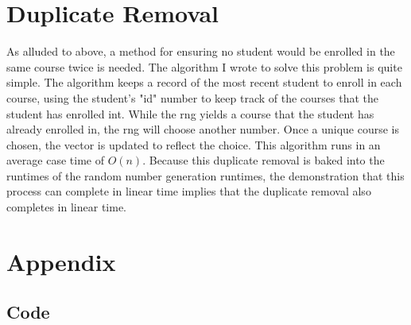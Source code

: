 \documentclass[11pt]{article}
\begin{document}
\section{Duplicate Removal}
As alluded to above, a method for ensuring no student would be enrolled in the same course twice is needed. The algorithm I wrote to solve this problem is quite simple. The algorithm keeps a record of the most recent student to enroll in each course, using the student's "id" number to keep track of the courses that the student has enrolled int. While the rng yields a course that the student has already enrolled in, the rng will choose another number. Once a unique course is chosen, the vector is updated to reflect the choice. This algorithm runs in an average case time of $O(n)$.  Because this duplicate removal is baked into the runtimes of the random number generation runtimes, the demonstration that this process can complete in linear time implies that the duplicate removal also completes in linear time.
\newpage

\section{Appendix}
\subsection{Code}
\end{document}
